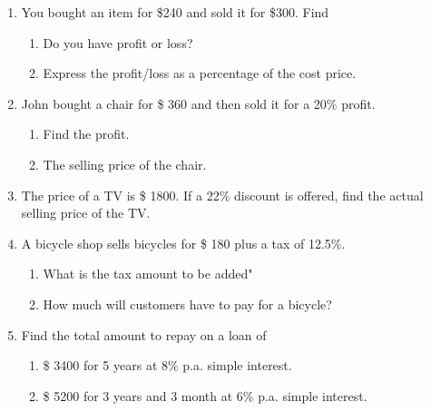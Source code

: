 \documentclass[fleqn, a4paper, 11pt]{article}
\begin{document}
\begin{enumerate}
\begin{enumerate}[itemsep=0.7in]
	      \end{enumerate}
	      \vspace{1in}
	      \newpage

	\item You bought an item for \$240 and sold it for \$300. Find
	      \begin{enumerate}[itemsep=0.7in]
		      \item Do you have profit or loss?
		      \item Express the profit/loss as a percentage of the cost price.
	      \end{enumerate}
	      \vspace{1in}

	\item John bought a chair for \$ 360 and then sold it for a 20\% profit.
	      \begin{enumerate}[itemsep=0.7in]
		      \item Find the profit.
		      \item The selling price of the chair.

	      \end{enumerate}
	      \vspace{1in}

	\item The price of a TV is \$ 1800. If a 22\% discount is offered, find the actual selling price of the TV.

	      \vspace{1in}
	\item A bicycle shop sells bicycles for \$ 180 plus a tax of 12.5\%.
	      \begin{enumerate}[itemsep=0.7in]
		      \item What is the tax amount to be added"
		      \item How much will customers have to pay for a bicycle?


	      \end{enumerate}
	      \vspace{1in}
	      \newpage

	\item Find the total amount to repay on a loan of
	      \begin{enumerate}[itemsep=1.5in]
		      \item \$ 3400 for 5 years at 8\% p.a. simple interest.
		      \item \$ 5200 for 3 years and 3 month at 6\% p.a. simple interest.


	      \end{enumerate}
	      \vspace{1.7in}


\end{enumerate}
\end{document}
